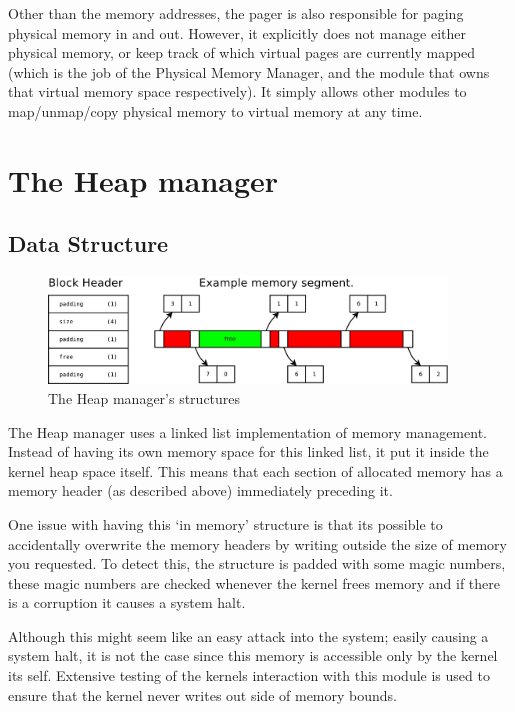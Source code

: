 \documentclass[a4paper]{report}
\begin{document}
Other than the memory addresses, the pager is also responsible for paging physical memory in and out. However, it explicitly does not manage either physical memory, or keep track of which virtual pages are currently mapped (which is the job of the Physical Memory Manager, and the module that owns that virtual memory space respectively). It simply allows other modules to map/unmap/copy physical memory to virtual memory at any time.













\section{The Heap manager}

\subsection{Data Structure}

\begin{figure}[ht]
\centering
\includegraphics[width=400px]{images/Heap_Manager}
\caption{The Heap manager's structures}
\label{fig:WinTitleBarScreen}
\end{figure}

The Heap manager uses a linked list implementation of memory management. Instead of having its own memory space for this linked list, it put it inside the kernel heap space itself. This means that each section of allocated memory has a memory header (as described above) immediately preceding it.

One issue with having this `in memory' structure is that its possible to accidentally overwrite the memory headers by writing outside the size of memory you requested. To detect this, the structure is padded with some magic numbers, these magic numbers are checked whenever the kernel frees memory and if there is a corruption it causes a system halt.

Although this might seem like an easy attack into the system; easily causing a system halt, it is not the case since this memory is accessible only by the kernel its self. Extensive testing of the kernels interaction with this module is used to ensure that the kernel never writes out side of memory bounds.
\end{document}
